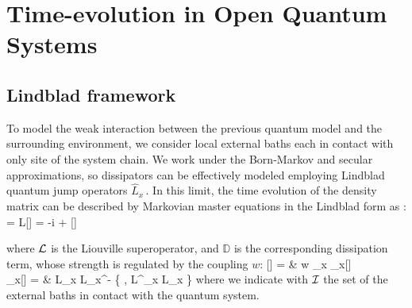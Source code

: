 \section{Time-evolution in Open Quantum Systems}


\subsection{Lindblad framework}

To model the weak interaction between the previous quantum model and the surrounding
environment, we consider local external baths each in contact with only site of the system
chain. We work under the Born-Markov and secular approximations, so dissipators 
can be effectively modeled employing Lindblad quantum jump operators $\hat L_x\,$. 
In this limit, the time evolution of the density matrix can be described by Markovian
master equations in the Lindblad form as \cite{BP-openquantumsystembook, TV-2021-dissipativeboundaries, TV-2022-localizedparticleloss}:
	 = {\cal L}[\rho] = 
		-i  +  \pc
\ea

where ${\cal L}$ is the Liouville superoperator, and $\mathbb{D}$ is the corresponding 
dissipation term, whose strength is regulated by the coupling $w$:
	[\rho] = & w \sum_{x } 
		_x[\rho] \cm \\
	_x[\rho] = &
		\hat L_x \rho \hat L_x^\dagger - 
		 \Bigl\{ \rho, \hat L^\dagger_x \hat L_x \Bigl\} \pc
\ea
where we indicate with ${\cal I}$ the set of the external baths in contact with the
quantum system.

